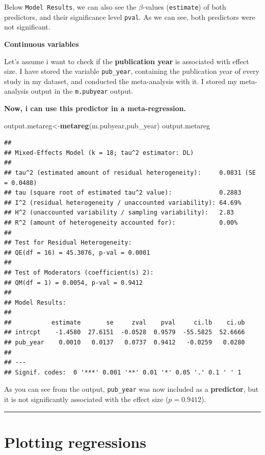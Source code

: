 \documentclass[]{book}
\newenvironment{Shaded}{\begin{snugshade}}{\end{snugshade}}
\newcommand{\KeywordTok}[1]{\textcolor[rgb]{0.13,0.29,0.53}{\textbf{#1}}}
\newcommand{\NormalTok}[1]{#1}
\begin{document}
Below \texttt{Model\ Results}, we can also see the \(\beta\)-values (\texttt{estimate}) of both predictors, and their significance level \texttt{pval}. As we can see, both predictors were not significant.

\textbf{Continuous variables}

Let's assume i want to check if the \textbf{publication year} is associated with effect size. I have stored the variable \texttt{pub\_year}, containing the publication year of every study in my dataset, and conducted the meta-analysis with it. I stored my meta-analysis output in the \texttt{m.pubyear} output.

\textbf{Now, i can use this predictor in a meta-regression.}

\begin{Shaded}
\begin{Highlighting}[]
\NormalTok{output.metareg<-}\KeywordTok{metareg}\NormalTok{(m.pubyear,pub_year)}
\NormalTok{output.metareg}
\end{Highlighting}
\end{Shaded}

\begin{verbatim}
## 
## Mixed-Effects Model (k = 18; tau^2 estimator: DL)
## 
## tau^2 (estimated amount of residual heterogeneity):     0.0831 (SE = 0.0488)
## tau (square root of estimated tau^2 value):             0.2883
## I^2 (residual heterogeneity / unaccounted variability): 64.69%
## H^2 (unaccounted variability / sampling variability):   2.83
## R^2 (amount of heterogeneity accounted for):            0.00%
## 
## Test for Residual Heterogeneity: 
## QE(df = 16) = 45.3076, p-val = 0.0001
## 
## Test of Moderators (coefficient(s) 2): 
## QM(df = 1) = 0.0054, p-val = 0.9412
## 
## Model Results:
## 
##           estimate       se     zval    pval     ci.lb    ci.ub   
## intrcpt    -1.4580  27.6151  -0.0528  0.9579  -55.5825  52.6666   
## pub_year    0.0010   0.0137   0.0737  0.9412   -0.0259   0.0280   
## 
## ---
## Signif. codes:  0 '***' 0.001 '**' 0.01 '*' 0.05 '.' 0.1 ' ' 1
\end{verbatim}

As you can see from the output, \texttt{pub\_year} was now included as a \textbf{predictor}, but it is not significantly associated with the effect size (\(p=0.9412\)).

\begin{center}\rule{0.5\linewidth}{\linethickness}\end{center}

\hypertarget{plotting-regressions}{%
\section{Plotting regressions}\label{plotting-regressions}}
\end{document}
